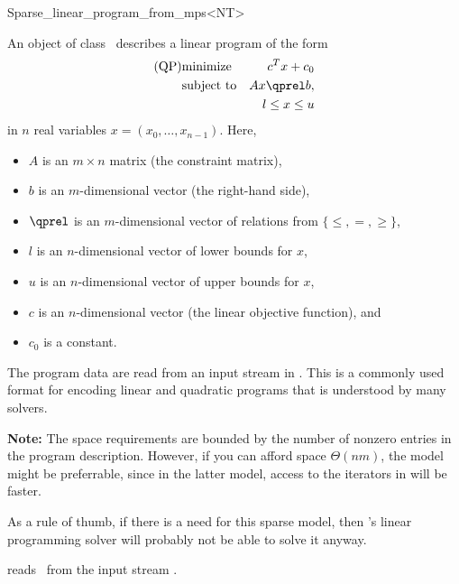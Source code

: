 \begin{ccRefClass}{Sparse_linear_program_from_mps<NT>}


\ccDefinition
An object of class \ccRefName\ describes a linear program of the form
\begin{eqnarray*}
\mbox{(QP)}& \mbox{minimize} & c^{T}x+c_0 \\
&\mbox{subject to}   & Ax\qprel b, \\
&                    & l \leq x \leq u
\end{eqnarray*}
in $n$ real variables $x=(x_0,\ldots,x_{n-1})$.
Here, 
\begin{itemize}
\item $A$ is an $m\times n$ matrix (the constraint matrix), 
\item $b$ is an $m$-dimensional vector (the right-hand side),
\item $\qprel$ is an $m$-dimensional vector of relations 
from $\{\leq, =, \geq\}$, 
\item $l$ is an $n$-dimensional vector of lower
bounds for $x$,
\item $u$ is an $n$-dimensional vector of upper bounds for
$x$, 
\item $c$ is an $n$-dimensional vector (the linear objective
  function), and 
\item $c_0$ is a constant.
\end{itemize}

The program data are read from an input stream in . This is
a commonly used format for encoding linear and quadratic programs that
is understood by many solvers. 

\textbf{Note:} 
The space requirements are bounded by the number of nonzero entries
in the program description. However, if you can afford space
$\Theta(nm)$, the model 
might be preferrable, since in the latter model, access to the 
iterators in  will be faster.

As a rule of thumb, if there is a need for this sparse model,
then \cgal's linear programming solver will probably not be able to 
solve it anyway.
\ccIsModel
{}

\ccCreation
\ccIndexClassCreation
{}

 {reads \ccVar\ from the input stream .}


\end{ccRefClass}
